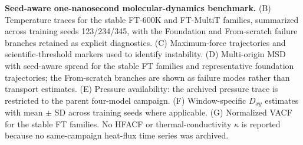 \textbf{Seed-aware one-nanosecond molecular-dynamics benchmark.} (B) Temperature traces for the stable FT-600K and FT-MultiT families, summarized across training seeds 123/234/345, with the Foundation and From-scratch failure branches retained as explicit diagnostics. (C) Maximum-force trajectories and scientific-threshold markers used to identify instability. (D) Multi-origin MSD with seed-aware spread for the stable FT families and representative foundation trajectories; the From-scratch branches are shown as failure modes rather than transport estimates. (E) Pressure availability: the archived pressure trace is restricted to the parent four-model campaign. (F) Window-specific $D_{xy}$ estimates with mean $\pm$ SD across training seeds where applicable. (G) Normalized VACF for the stable FT families. No HFACF or thermal-conductivity $\kappa$ is reported because no same-campaign heat-flux time series was archived.
